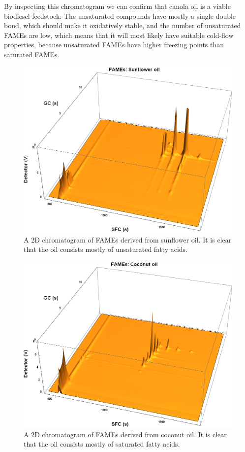 By inspecting this chromatogram we can confirm that canola oil is a viable
biodiesel feedstock: The unsaturated compounds have mostly a single double bond,
which should make it oxidatively stable, and the number of unsaturated FAMEs are
low, which means that it will most likely have suitable cold-flow properties,
because unsaturated FAMEs have higher freezing points than saturated FAMEs.


\begin{figure}
\centering
\includegraphics[width=\textwidth]{Figures/Sunflower.png}
\decoRule

\caption[SFC×GC of sunflower oil]{A 2D chromatogram of FAMEs derived from
sunflower oil. It is clear that the oil consists mostly of unsaturated fatty
acids.}

\label{fig:2DSunflower}
\end{figure}


\begin{figure}
\centering
\includegraphics[width=\textwidth]{Figures/Coconut.png}
\decoRule

\caption[SFC×GC of coconut oil]{A 2D chromatogram of FAMEs derived from
coconut oil. It is clear that the oil consists mostly of saturated fatty
acids.}

\label{fig:2DCoconut}
\end{figure}


